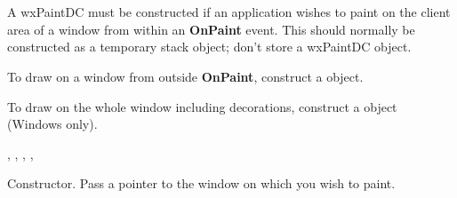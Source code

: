 \section{}\label{wxpaintdc}

A wxPaintDC must be constructed if an application wishes to paint on the
client area of a window from within an {\bf OnPaint} event.
This should normally be constructed as a temporary stack object; don't store
a wxPaintDC object.

To draw on a window from outside {\bf OnPaint}, construct a  object.

To draw on the whole window including decorations, construct a  object
(Windows only).




, , ,\rtfsp
{}, 




Constructor. Pass a pointer to the window on which you wish to paint.



